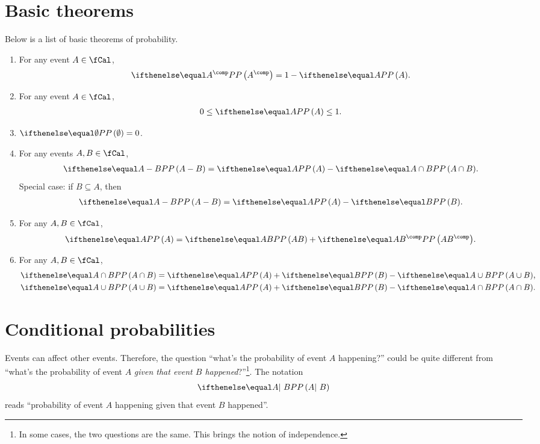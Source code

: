 \section{Basic theorems}
\begin{mytheoremarg}
    \label{thm:basic theorems of probability}
    Below is a list of basic theorems of probability.
    \begin{enumerate}
        \item For any event $A\in\fCal$, 
        \begin{align}
            \prob{A^{\comp}} = 1-\prob{A}.
        \end{align}

        \item For any event $A\in\fCal$, 
        \begin{align}
            0\leq \prob{A} \leq 1.
        \end{align} 
        
        \item $\prob{\emptyset} = 0$.
        \item For any events $A, B\in\fCal$, 
        \begin{align}
            \prob{A-B} = \prob{A} - \prob{A\cap B}.
        \end{align}
        Special case: if $B\subseteq A$, then
        \begin{align}
            \prob{A-B} = \prob{A}-\prob{B}.
        \end{align}
        
        \item For any $A, B \in \fCal$, 
        \begin{align}
            \prob{A} = \prob{AB} + \prob{AB^\comp}.
        \end{align}
        
        \item For any $A,B\in\fCal$,
        \begin{align}
            \prob{A\cap B} &= \prob{A} + \prob{B} - \prob{A\cup B},\\
            \prob{A\cup B} &= \prob{A} + \prob{B} - \prob{A\cap B}.
        \end{align}
    \end{enumerate}
\end{mytheoremarg}

\section{Conditional probabilities}
 Events can affect other events. Therefore, the question ``what's the probability of event $A$ happening?'' could be quite different from ``what's the probability of event $A$ \emph{given that event $B$ happened}?''\footnote{In some cases, the two questions are the same. This brings the notion of independence.}. The notation
 \begin{align}
   \prob{A |~ B}    
 \end{align}
reads ``probability of event $A$ happening given that event $B$ happened''.

